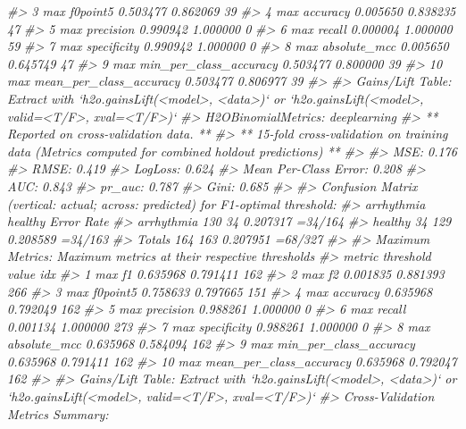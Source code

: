 \documentclass[]{book}
\newenvironment{Shaded}{\begin{snugshade}}{\end{snugshade}}
\newcommand{\CommentTok}[1]{\textcolor[rgb]{0.56,0.35,0.01}{\textit{#1}}}
\begin{document}
\begin{Shaded}
\begin{Highlighting}[]
{{{{{{\CommentTok{#> 3                 max f0point5  0.503477 0.862069  39}
\CommentTok{#> 4                 max accuracy  0.005650 0.838235  47}
\CommentTok{#> 5                max precision  0.990942 1.000000   0}
\CommentTok{#> 6                   max recall  0.000004 1.000000  59}
\CommentTok{#> 7              max specificity  0.990942 1.000000   0}
\CommentTok{#> 8             max absolute_mcc  0.005650 0.645749  47}
\CommentTok{#> 9   max min_per_class_accuracy  0.503477 0.800000  39}
\CommentTok{#> 10 max mean_per_class_accuracy  0.503477 0.806977  39}
\CommentTok{#> }
\CommentTok{#> Gains/Lift Table: Extract with `h2o.gainsLift(<model>, <data>)` or `h2o.gainsLift(<model>, valid=<T/F>, xval=<T/F>)`}
\CommentTok{#> H2OBinomialMetrics: deeplearning}
\CommentTok{#> ** Reported on cross-validation data. **}
\CommentTok{#> ** 15-fold cross-validation on training data (Metrics computed for combined holdout predictions) **}
\CommentTok{#> }
\CommentTok{#> MSE:  0.176}
\CommentTok{#> RMSE:  0.419}
\CommentTok{#> LogLoss:  0.624}
\CommentTok{#> Mean Per-Class Error:  0.208}
\CommentTok{#> AUC:  0.843}
\CommentTok{#> pr_auc:  0.787}
\CommentTok{#> Gini:  0.685}
\CommentTok{#> }
\CommentTok{#> Confusion Matrix (vertical: actual; across: predicted) for F1-optimal threshold:}
\CommentTok{#>            arrhythmia healthy    Error     Rate}
\CommentTok{#> arrhythmia        130      34 0.207317  =34/164}
\CommentTok{#> healthy            34     129 0.208589  =34/163}
\CommentTok{#> Totals            164     163 0.207951  =68/327}
\CommentTok{#> }
\CommentTok{#> Maximum Metrics: Maximum metrics at their respective thresholds}
\CommentTok{#>                         metric threshold    value idx}
\CommentTok{#> 1                       max f1  0.635968 0.791411 162}
\CommentTok{#> 2                       max f2  0.001835 0.881393 266}
\CommentTok{#> 3                 max f0point5  0.758633 0.797665 151}
\CommentTok{#> 4                 max accuracy  0.635968 0.792049 162}
\CommentTok{#> 5                max precision  0.988261 1.000000   0}
\CommentTok{#> 6                   max recall  0.001134 1.000000 273}
\CommentTok{#> 7              max specificity  0.988261 1.000000   0}
\CommentTok{#> 8             max absolute_mcc  0.635968 0.584094 162}
\CommentTok{#> 9   max min_per_class_accuracy  0.635968 0.791411 162}
\CommentTok{#> 10 max mean_per_class_accuracy  0.635968 0.792047 162}
\CommentTok{#> }
\CommentTok{#> Gains/Lift Table: Extract with `h2o.gainsLift(<model>, <data>)` or `h2o.gainsLift(<model>, valid=<T/F>, xval=<T/F>)`}
\CommentTok{#> Cross-Validation Metrics Summary: }
}}}}}}
\end{Highlighting}
\end{Shaded}
\end{document}
